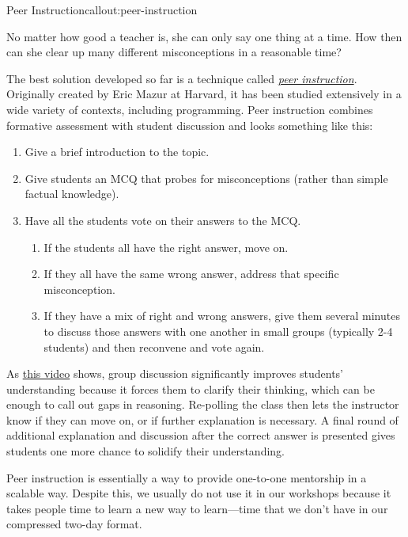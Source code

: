 \begin{callout}{Peer Instruction}{callout:peer-instruction}

No matter how good a teacher is, she can only say one thing at a time.
How then can she clear up many different misconceptions in a reasonable
time?

The best solution developed so far is a technique called
\emph{\href{https://en.wikipedia.org/wiki/Peer\_instruction}{peer
instruction}}. Originally created by Eric Mazur at Harvard, it has been
studied extensively in a wide variety of contexts, including
programming. Peer instruction combines formative assessment with student
discussion and looks something like this:

\begin{enumerate}
\item
  Give a brief introduction to the topic.
\item
  Give students an MCQ that probes for misconceptions (rather than
  simple factual knowledge).
\item
  Have all the students vote on their answers to the MCQ.

  \begin{enumerate}
    \item
    If the students all have the right answer, move on.
  \item
    If they all have the same wrong answer, address that specific
    misconception.
  \item
    If they have a mix of right and wrong answers, give them several
    minutes to discuss those answers with one another in small groups
    (typically 2-4 students) and then reconvene and vote again.
  \end{enumerate}
\end{enumerate}

As \href{https://www.youtube.com/watch?t=1\&v=2LbuoxAy56o}{this video}
shows, group discussion significantly improves students' understanding
because it forces them to clarify their thinking, which can be enough to
call out gaps in reasoning. Re-polling the class then lets the
instructor know if they can move on, or if further explanation is
necessary. A final round of additional explanation and discussion after
the correct answer is presented gives students one more chance to
solidify their understanding.

Peer instruction is essentially a way to provide one-to-one mentorship
in a scalable way. Despite this, we usually do not use it in our
workshops because it takes people time to learn a new way to
learn---time that we don't have in our compressed two-day format.
\end{callout}

